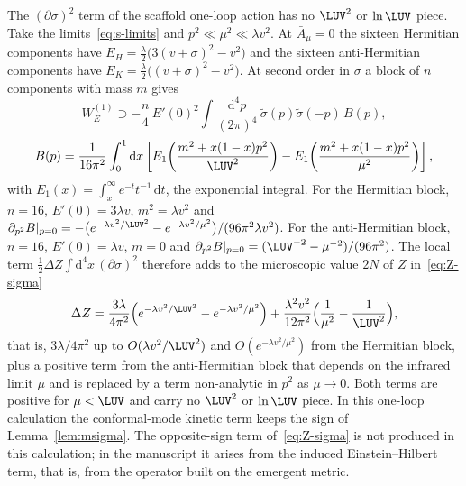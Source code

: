 The \((\partial\sigma)^2\) term of the scaffold one-loop action has no
\(\LUV^2\) or \(\ln\LUV\) piece. Take the limits~\eqref{eq:s-limits}
and \(p^2\ll\mu^2\ll\lambda v^2\). At \(\bar A_\mu=0\) the sixteen
Hermitian components have
\(E_H=\tfrac\lambda2\bigl(3(v+\sigma)^2-v^2\bigr)\) and the sixteen
anti-Hermitian components have
\(E_K=\tfrac\lambda2\bigl((v+\sigma)^2-v^2\bigr)\). At second order in
\(\sigma\) a block of \(n\) components with mass \(m\) gives
\[
  W_E^{(1)}\supset
  -\frac n4\,E'(0)^2\int\frac{\mathrm{d}^4p}{(2\pi)^4}\,
   \tilde\sigma(p)\tilde\sigma(-p)\,B(p),
\]
\[
  B(p)=\frac{1}{16\pi^2}\int_0^1\mathrm{d}x\left[
   E_1\!\left(\frac{m^2+x(1-x)p^2}{\LUV^2}\right)
   -E_1\!\left(\frac{m^2+x(1-x)p^2}{\mu^2}\right)\right],
\]
with \(E_1(x)=\int_x^\infty e^{-t}t^{-1}\,\mathrm dt\), the exponential
integral. For the Hermitian block, \(n=16\), \(E'(0)=3\lambda v\),
\(m^2=\lambda v^2\) and
\(\partial_{p^2}B|_{p=0}=-\bigl(e^{-\lambda v^2/\LUV^2}
-e^{-\lambda v^2/\mu^2}\bigr)/(96\pi^2\lambda v^2)\). For the
anti-Hermitian block, \(n=16\), \(E'(0)=\lambda v\), \(m=0\) and
\(\partial_{p^2}B|_{p=0}=(\LUV^{-2}-\mu^{-2})/(96\pi^2)\). The local
term \(\tfrac12\Delta Z\int\mathrm{d}^4x\,(\partial\sigma)^2\) therefore
adds to the microscopic value \(2N\) of \(Z\) in~\eqref{eq:Z-sigma}
\[
  \Delta Z=\frac{3\lambda}{4\pi^2}
   \Bigl(e^{-\lambda v^2/\LUV^2}-e^{-\lambda v^2/\mu^2}\Bigr)
   +\frac{\lambda^2v^2}{12\pi^2}\Bigl(\frac1{\mu^2}-\frac1{\LUV^2}\Bigr),
\]
that is, \(3\lambda/4\pi^2\) up to \(O(\lambda v^2/\LUV^2)\) and
\(O(e^{-\lambda v^2/\mu^2})\) from the Hermitian block, plus a positive
term from the anti-Hermitian block that depends on the infrared limit
\(\mu\) and is replaced by a term non-analytic in \(p^2\) as
\(\mu\to0\). Both terms are positive for \(\mu<\LUV\) and carry
no \(\LUV^2\) or \(\ln\LUV\) piece. In this one-loop calculation the
conformal-mode kinetic term keeps the sign of Lemma~\ref{lem:msigma}.
The opposite-sign term of~\eqref{eq:Z-sigma} is not produced in this
calculation; in the manuscript it arises from the induced
Einstein--Hilbert term, that is, from the operator built on the
emergent metric.

